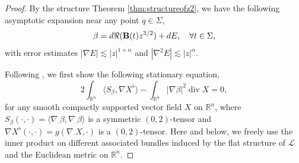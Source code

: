 \documentclass[11pt,a4paper]{article}
\numberwithin{equation}{section}%
\theoremstyle{definition}
\newcommand{\R}{\mathbb{R}}
\begin{document}
\begin{proof}By the structure Theorem \ref{thm:structureofz2}, we have
the following asymptotic expansion near any point $q\in \Sigma$,
    \begin{equation}
        \begin{aligned}
        \label{eqn:asymptoteofbeta}
            \beta=d\Re({\bf{B}}(t)z^{3/2})+dE,\quad  \forall t\in \Sigma,
        \end{aligned}
    \end{equation}
    with error estimates $|\nabla E|\lesssim |z|^{1+\alpha}$ and $|\nabla^2 E|\lesssim |z|^\alpha$.  

Following \cite[Chapter 3]{DeLellis-Spadaro}, we first show the following stationary equation,
    \begin{equation}
        \label{eqn:first-variation-of-beta}
        2\int_{\R^n}\langle S_\beta,\nabla X^\flat\rangle-\int_{\R^n}|\nabla \beta|^2\operatorname{div}X=0,
    \end{equation}
    for any smooth compactly supported vector field $X$ on $\R^n$, where $S_\beta(\cdot,\cdot)=\langle \nabla_\cdot\beta,\nabla_\cdot\beta\rangle$ is a symmetric $(0,2)$-tensor and $\nabla X^\flat(\cdot,\cdot)=g(\nabla_\cdot X,\cdot)$ is a $(0,2)$-tensor. Here and below, we freely use the inner product on different associated bundles induced by the flat structure of $\mathcal{L}$ and the Euclidean metric on $\R^n$. 
    



\end{proof}
\end{document}
